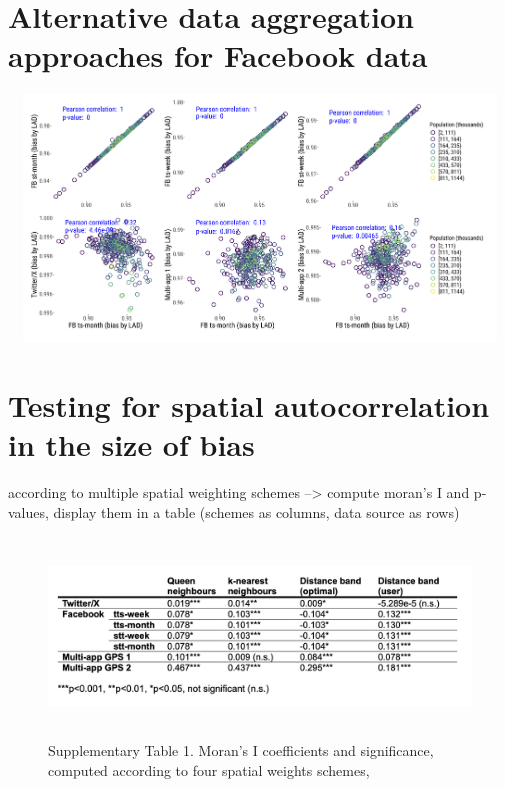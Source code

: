 \documentclass[]{rsos}%
\begin{document}
\newpage

\section{Alternative data aggregation approaches for Facebook data}\label{alternative-data-aggregation-approaches-for-facebook-data}

\includegraphics[width=5.35417in,height=2.58333in]{figures/Fig-compare-bias-size.png}

\section{Testing for spatial autocorrelation in the size of bias}\label{testing-for-spatial-autocorrelation-in-the-size-of-bias}

according to multiple spatial weighting schemes --\textgreater{} compute moran's I
and p-values, display them in a table (schemes as columns, data source
as rows)

\begin{figure}
\centering
\includegraphics[width=5.20833in,height=2.08333in]{figures/Table-si.png}
\caption{Supplementary Table 1. Moran's I coefficients and significance,
computed according to four spatial weights schemes,}
\end{figure}

\end{document}

